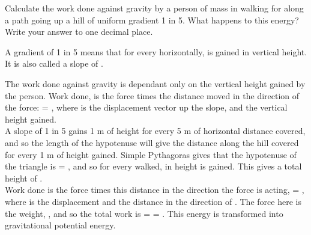 
\begin{problem}[O1980PIQ2a]%
{Calculate the work done against gravity by a person of mass  in walking for  along a path going up a hill of uniform gradient 1 in 5. What happens to this energy? Write your answer to one decimal place.

 A gradient of 1 in 5 means that for every  horizontally,  is gained in vertical height. It is also called a slope of .}
{}
{The work done against gravity is dependant only on the vertical height gained by the person. Work done,  is the force times the distance moved in the direction of the force:  = , where  is the displacement vector up the slope, and  the vertical height gained. \\

A slope of 1 in 5 gains 1 m of height for every 5 m of horizontal distance covered, and so the length of the hypotenuse will give the distance along the hill covered for every 1 m of height gained. Simple Pythagoras gives that the hypotenuse of the triangle is  = , and so for every  walked,  in height is gained. This gives a total height of .\\

Work done is the force times this distance in the direction the force is acting,  = , where  is the displacement and  the distance in the direction of . The force here is the weight, , and so the total work is  =  = . This energy is transformed into gravitational potential energy.
}
\end{problem}
